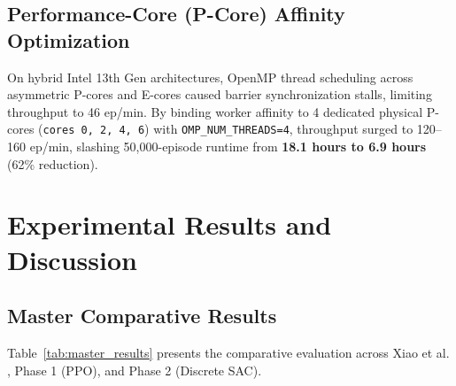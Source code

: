 \documentclass[journal]{IEEEtran}
\begin{document}
\subsection{Performance-Core (P-Core) Affinity Optimization}
On hybrid Intel 13th Gen architectures, OpenMP thread scheduling across asymmetric P-cores and E-cores caused barrier synchronization stalls, limiting throughput to 46 ep/min. By binding worker affinity to 4 dedicated physical P-cores (\texttt{cores 0, 2, 4, 6}) with \texttt{OMP\_NUM\_THREADS=4}, throughput surged to 120--160 ep/min, slashing 50,000-episode runtime from \textbf{18.1 hours to 6.9 hours} (62\% reduction).

\section{Experimental Results and Discussion}

\subsection{Master Comparative Results}
Table~\ref{tab:master_results} presents the comparative evaluation across Xiao et al. \cite{xiao2024decision}, Phase 1 (PPO), and Phase 2 (Discrete SAC).
\end{document}
